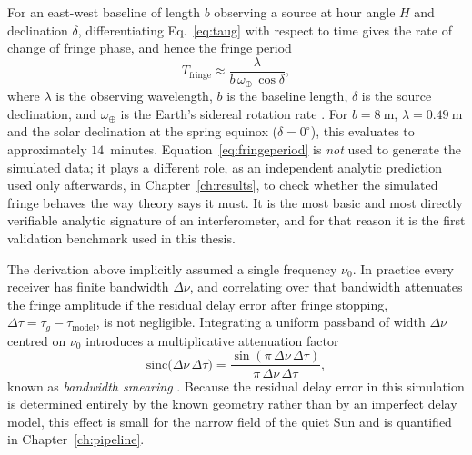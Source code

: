 For an east-west baseline of length $b$ observing a source at hour angle $H$
and declination $\delta$, differentiating Eq.~\eqref{eq:taug} with respect to
time gives the rate of change of fringe phase, and hence the fringe period
\begin{equation}
  T_\mathrm{fringe} \approx \frac{\lambda}{b\,\omega_\oplus\,\cos\delta},
  \label{eq:fringeperiod}
\end{equation}
where $\lambda$ is the observing wavelength, $b$ is the baseline length, $\delta$
is the source declination, and $\omega_\oplus$ is the Earth's sidereal
rotation rate \citep{taylor1999synthesis,tms2017}. For $b=\SI{8}{\metre}$,
$\lambda=\SI{0.49}{\metre}$ and the solar declination at the spring equinox
($\delta = 0^\circ$), this evaluates to approximately $14$~minutes.
Equation~\eqref{eq:fringeperiod} is \emph{not} used to generate the simulated
data; it plays a different role, as an independent analytic prediction used
only afterwards, in Chapter~\ref{ch:results}, to check whether the simulated
fringe behaves the way theory says it must. It is the most basic and most
directly verifiable analytic signature of an interferometer, and for that
reason it is the first validation benchmark used in this thesis.

The derivation above implicitly assumed a single frequency $\nu_0$. In
practice every receiver has finite bandwidth $\Delta\nu$, and correlating over
that bandwidth attenuates the fringe amplitude if the residual delay error
after fringe stopping, $\Delta\tau = \tau_g - \tau_\mathrm{model}$, is not
negligible. Integrating a uniform passband of width $\Delta\nu$ centred on
$\nu_0$ introduces a multiplicative attenuation factor
\begin{equation}
  \mathrm{sinc}\!\big(\Delta\nu\,\Delta\tau\big)
  = \frac{\sin(\pi\,\Delta\nu\,\Delta\tau)}{\pi\,\Delta\nu\,\Delta\tau},
  \label{eq:bandwidth-smearing}
\end{equation}
known as \emph{bandwidth smearing} \citep{tms2017}. Because the residual delay
error in this simulation is determined entirely by the known geometry rather
than by an imperfect delay model, this effect is small for the narrow field of
the quiet Sun and is quantified in Chapter~\ref{ch:pipeline}.

